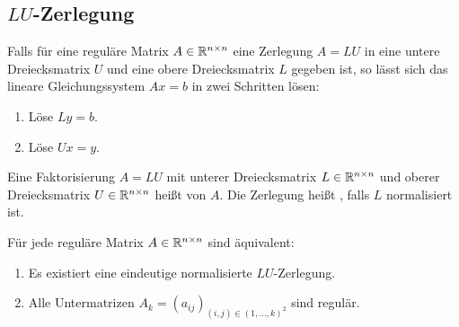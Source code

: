 \documentclass{report}
\begin{document}
\subsection{$LU$-Zerlegung}
Falls für eine reguläre Matrix $A \in \mathbb{R}^{n \times n}$ eine Zerlegung $A = LU$ in eine untere Dreiecksmatrix $U$ und eine obere Dreiecksmatrix $L$ gegeben ist, so lässt sich das lineare Gleichungssystem $Ax = b$ in zwei Schritten lösen:
\begin{enumerate}
	\item Löse $Ly = b$.
	\item Löse $Ux = y$.
\end{enumerate}
\begin{definition}
	Eine Faktorisierung $A = LU$ mit unterer Dreiecksmatrix $L \in \mathbb{R}^{n \times n}$ und oberer Dreiecksmatrix $U \in \mathbb{R}^{n \times n}$ heißt  von $A$. Die Zerlegung heißt , falls $L$ normalisiert ist.
\end{definition}
\begin{theorem}
	Für jede reguläre Matrix $A \in \mathbb{R}^{n \times n}$ sind äquivalent:
	\begin{enumerate}
		\item Es existiert eine eindeutige normalisierte $LU$-Zerlegung.
		\item Alle Untermatrizen $A_k = (a_{ij})_{(i,j) \in (1, \hdots, k)^2}$ sind regulär. 
	\end{enumerate}
\end{theorem}
\end{document}
